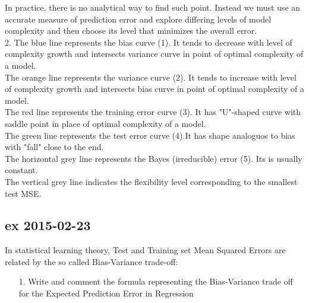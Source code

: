 \documentclass[a4paper,12pt,titlepage]{article} %
\begin{document}
In practice, there is no analytical way to find such point. Instead we must use an accurate measure of prediction error and explore differing levels of model complexity and then choose its level that minimizes the overall error. \\

2. The blue line represents the bias curve (1). It tends to decrease with level of complexity growth and intersects variance curve in point of optimal complexity of a model. \\
The orange line represents the variance curve (2). It tends to increase with level of complexity growth and intersects bias curve in point of optimal complexity of a model. \\
The red line represents the training error curve (3). It has "U"-shaped curve with saddle point in place of optimal complexity of a model. \\
The green line represents the test error curve (4).It has shape analoguos to bias with "fall" close to the end.\\
The horizontal grey line represents the Bayes (irreducible) error (5). Its is usually constant. \\
The vertical grey line indicates the flexibility level corresponding to the smallest test MSE.	\\
		


\newpage
\subsection{ex 2015-02-23}
In statistical learning theory, Test and Training set Mean Squared Errors are related by the so called Bias-Variance trade-off:

\begin{itemize}
\item[1.] Write and comment the formula representing the Bias-Variance trade off for the Expected Prediction Error in Regression
\end{itemize}
\end{document}
